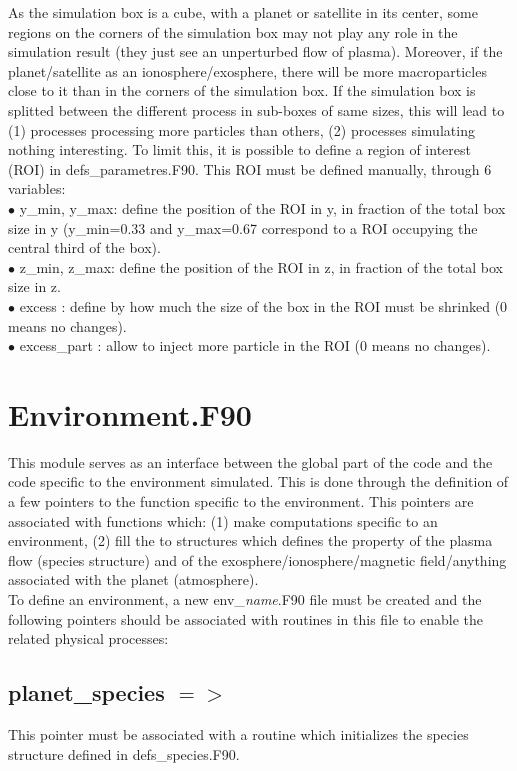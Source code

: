 \documentclass{article}
\begin{document}
As the simulation box is a cube, with a planet or satellite in its center, some regions on the corners of the simulation box may not play any role in the simulation result (they just see an unperturbed flow of plasma). Moreover, if the planet/satellite as an ionosphere/exosphere, there will be more macroparticles close to it than in the corners of the simulation box. If the simulation box is splitted between the different process in sub-boxes of same sizes, this will lead to (1) processes processing more particles than others, (2) processes simulating nothing interesting. To limit this, it is possible to define a region of interest (ROI) in defs\_parametres.F90. This ROI must be defined manually, through 6 variables:\\
$\bullet$ y\_min, y\_max: define the position of the ROI in y, in fraction of the total box size in y (y\_min=0.33 and y\_max=0.67 correspond to a ROI occupying the central third of the box).\\
$\bullet$ z\_min, z\_max: define the position of the ROI in z, in fraction of the total box size in z.\\
$\bullet$ excess : define by how much the size of the box in the ROI must be shrinked (0 means no changes).\\
$\bullet$ excess\_part : allow to inject more particle in the ROI (0 means no changes).\\


\section{Environment.F90}
This module serves as an interface between the global part of the code and the code specific to the environment simulated. This is done through the definition of a few pointers to the function specific to the environment. This pointers are associated with functions which: (1) make computations specific to an environment, (2) fill the to structures which defines the property of the plasma flow ({\sf species} structure) and of the  exosphere/ionosphere/magnetic field/anything associated with the planet ({\sf atmosphere}).\\

To define an environment, a new {\sf env\_}{\it name}{\sf .F90} file must be created and the following pointers should be associated with routines in this file to enable the related physical processes:
\subsection{planet\_species $=>$}
This pointer must be associated with a routine which initializes the {\sf specie}s structure defined in {\sf defs\_species.F90}. 
\end{document}
